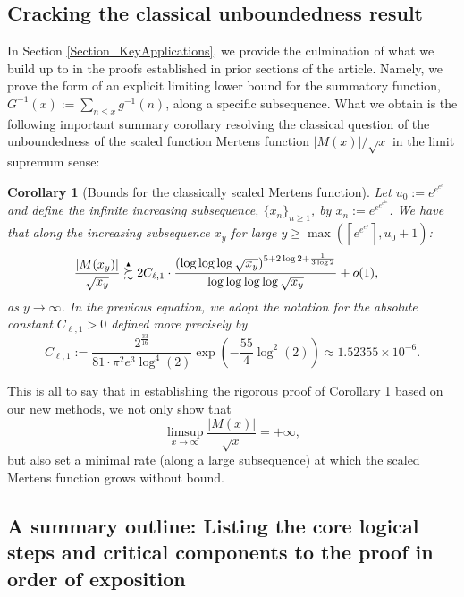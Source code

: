 \documentclass[11pt,reqno,a4letter]{article}
\numberwithin{figure}{section}
\numberwithin{table}{section}
\newcommand{\ceiling}[1]{\left\lceil #1 \right\rceil}
\theoremstyle{plain}
\newtheorem{cor}[theorem]{Corollary}
\numberwithin{theorem}{section}
\theoremstyle{definition}
\newcommand{\SuccSim}[0]{\overset{_{\scriptsize{\blacktriangle}}}{\succsim}}
\begin{document}
\subsection{Cracking the classical unboundedness result} 

In Section \ref{Section_KeyApplications}, 
we provide the culmination of what we build up to in the proofs established in 
prior sections of the article. 
Namely, we prove the form of an explicit limiting lower bound for the 
summatory function, $G^{-1}(x) := \sum_{n \leq x} g^{-1}(n)$, along a specific subsequence. 
What we obtain is the following important summary corollary resolving the classical question of the 
unboundedness of the scaled function Mertens function 
$|M(x)| / \sqrt{x}$ in the limit supremum sense: 

\begin{cor}[Bounds for the classically scaled Mertens function] 
\label{cor_ThePipeDreamResult_v1} 
Let $u_0 := e^{e^{e^{e}}}$ and define the infinite increasing subsequence, 
$\{x_n\}_{n \geq 1}$, by $x_n := e^{e^{e^{e^{4n}}}}$. 
We have that along the increasing subsequence $x_y$ for large 
$y \geq \max\left(\ceiling{e^{e^{e^{e}}}}, u_0+1\right)$: 
\begin{align*} 
\frac{|M(x_y)|}{\sqrt{x_y}} & \SuccSim 
     2C_{\ell,1} \cdot 
     \frac{(\log\log\log \sqrt{x_y})^{5 + 2\log 2 + \frac{1}{3\log 2}}}{\log\log\log\log \sqrt{x_y}} + o(1),  
\end{align*} 
as $y \rightarrow \infty$. In the previous equation, we adopt the notation for the 
absolute constant $C_{\ell,1} > 0$ defined more precisely by 
\[
C_{\ell,1} := \frac{2^{\frac{33}{16}}}{81 \cdot \pi^2 e^3 \log^4(2)} \exp\left(-\frac{55}{4} \log^2(2)\right) 
     \approx 1.52355 \times 10^{-6}. 
\]
\end{cor} 

This is all to say that in establishing the rigorous proof of 
Corollary \ref{cor_ThePipeDreamResult_v1} 
based on our new methods, we not only show that 
\[
\limsup_{x \rightarrow \infty} \frac{|M(x)|}{\sqrt{x}} = +\infty, 
\]
but also set a minimal rate (along a large subsequence) at which the 
scaled Mertens function grows without bound. 

\subsection{A summary outline: Listing the core logical steps and critical components to the proof in order of exposition} 
\end{document}
